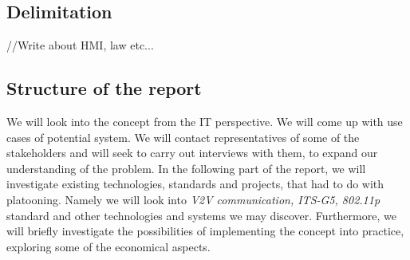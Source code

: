 \subsection{Delimitation}
//Write about HMI, law etc...
% 
% 
\subsection{Structure of the report}
We will look into the concept from the IT perspective. We will come up with use cases of potential system. We will contact representatives of some of the stakeholders and will seek to carry out interviews with them, to expand our understanding of the problem. In the following part of the report, we will investigate existing technologies, standards and projects, that had to do with platooning. Namely we will look into \emph{V2V communication, ITS-G5, 802.11p} standard and other technologies and systems we may discover. Furthermore, we will briefly investigate the possibilities of implementing the concept into practice, exploring some of the economical aspects.
% 
% 

